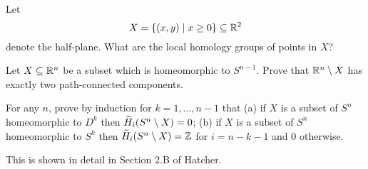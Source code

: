 \begin{problem}
	Let \[ X = \{(x,y) \mid x \ge 0\} \subseteq \mathbb R^2 \]
	denote the half-plane.
	What are the local homology groups of points in $X$?
\end{problem}

\begin{problem}
	\twochili
	Let $X \subseteq \mathbb R^n$ be a subset
	which is homeomorphic to $S^{n-1}$.
	Prove that $\mathbb R^n \setminus X$
	has exactly two path-connected components.
	\begin{hint}
		For any $n$, prove by induction for $k=1,\dots,n-1$ that
		(a) if $X$ is a subset of $S^n$ homeomorphic to $D^k$
		then $\widetilde H_i(S^n \setminus X) = 0$;
		(b) if $X$ is a subset of $S^n$ homeomorphic to $S^k$
		then $\widetilde H_i(S^n \setminus X) = \mathbb Z$ for $i=n-k-1$
		and $0$ otherwise.
	\end{hint}
	\begin{sol}
		This is shown in detail in Section 2.B of Hatcher.
	\end{sol}
\end{problem}
